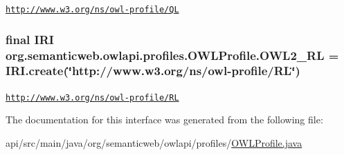 \href{http://www.w3.org/ns/owl-profile/QL}{\tt http\-://www.\-w3.\-org/ns/owl-\/profile/\-Q\-L} \hypertarget{interfaceorg_1_1semanticweb_1_1owlapi_1_1profiles_1_1_o_w_l_profile_a6b820d98ca83c28b0a934868b9409390}{
\subsubsection[{O\-W\-L2\-\_\-\-R\-L}]{\setlength{\rightskip}{0pt plus 5cm}final {\bf I\-R\-I} org.\-semanticweb.\-owlapi.\-profiles.\-O\-W\-L\-Profile.\-O\-W\-L2\-\_\-\-R\-L = {\bf I\-R\-I.\-create}(\char`\"{}http\-://www.\-w3.\-org/ns/owl-\/profile/R\-L\char`\"{})\hspace{0.3cm}{\ttfamily [static]}}}\label{interfaceorg_1_1semanticweb_1_1owlapi_1_1profiles_1_1_o_w_l_profile_a6b820d98ca83c28b0a934868b9409390}
\href{http://www.w3.org/ns/owl-profile/RL}{\tt http\-://www.\-w3.\-org/ns/owl-\/profile/\-R\-L} 

The documentation for this interface was generated from the following file\-:\begin{DoxyCompactItemize}
\item 
api/src/main/java/org/semanticweb/owlapi/profiles/\hyperlink{_o_w_l_profile_8java}{O\-W\-L\-Profile.\-java}\end{DoxyCompactItemize}

